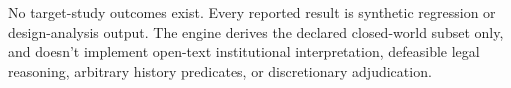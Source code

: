 No target-study outcomes exist. Every reported result is synthetic regression or design-analysis output. The engine derives the declared closed-world subset only, and doesn't implement open-text institutional interpretation, defeasible legal reasoning, arbitrary history predicates, or discretionary adjudication.
